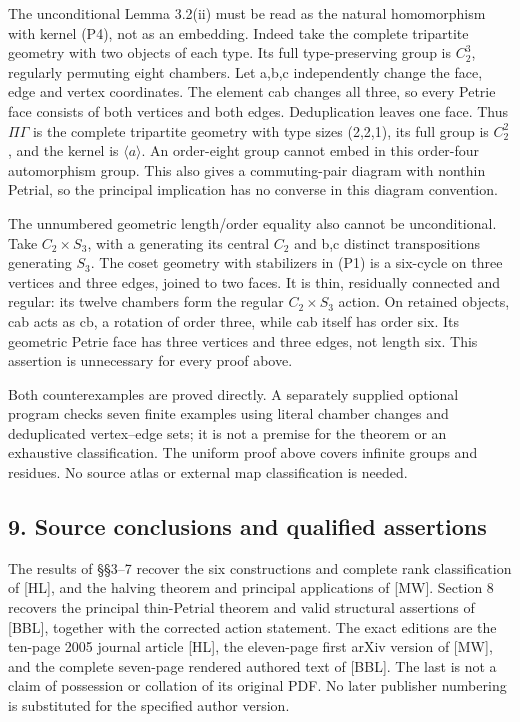 \documentclass[
  11pt,
  a4paper,
]{article}
\begin{document}
The unconditional Lemma 3.2(ii) must be read as the natural homomorphism
with kernel (P4), not as an embedding. Indeed take the complete
tripartite geometry with two objects of each type. Its full
type-preserving group is \(C_{2}^{3}\), regularly permuting eight
chambers. Let a,b,c independently change the face, edge and vertex
coordinates. The element cab changes all three, so every Petrie face
consists of both vertices and both edges. Deduplication leaves one face.
Thus \(\Pi \Gamma\) is the complete tripartite geometry with type sizes
(2,2,1), its full group is \(C_{2}^{2}\), and the kernel is
\(\langle a\rangle\). An order-eight group cannot embed in this
order-four automorphism group. This also gives a commuting-pair diagram
with nonthin Petrial, so the principal implication has no converse in
this diagram convention.

The unnumbered geometric length/order equality also cannot be
unconditional. Take \(C_{2}\times S_{3}\), with a generating its central
\(C_{2}\) and b,c distinct transpositions generating \(S_{3}\). The
coset geometry with stabilizers in (P1) is a six-cycle on three vertices
and three edges, joined to two faces. It is thin, residually connected
and regular: its twelve chambers form the regular \(C_{2}\times S_{3}\)
action. On retained objects, cab acts as cb, a rotation of order three,
while cab itself has order six. Its geometric Petrie face has three
vertices and three edges, not length six. This assertion is unnecessary
for every proof above.

Both counterexamples are proved directly. A separately supplied optional
program checks seven finite examples using literal chamber changes and
deduplicated vertex--edge sets; it is not a premise for the theorem or
an exhaustive classification. The uniform proof above covers infinite
groups and residues. No source atlas or external map classification is
needed.

\subsection{9. Source conclusions and qualified
assertions}\label{source-conclusions-and-qualified-assertions}

The results of §§3--7 recover the six constructions and complete rank
classification of {[}HL{]}, and the halving theorem and principal
applications of {[}MW{]}. Section 8 recovers the principal thin-Petrial
theorem and valid structural assertions of {[}BBL{]}, together with the
corrected action statement. The exact editions are the ten-page 2005
journal article {[}HL{]}, the eleven-page first arXiv version of
{[}MW{]}, and the complete seven-page rendered authored text of
{[}BBL{]}. The last is not a claim of possession or collation of its
original PDF. No later publisher numbering is substituted for the
specified author version.
\end{document}
